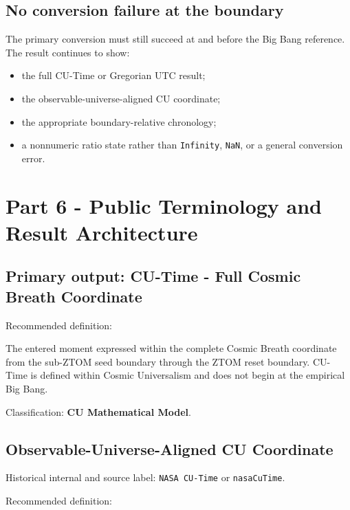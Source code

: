 \documentclass[11pt,letterpaper]{article}
\newcommand{\term}[1]{\textbf{\textsf{#1}}}
\begin{document}
\subsection{No conversion failure at the boundary}

The primary conversion must still succeed at and before the Big Bang reference.
The result continues to show:

\begin{itemize}
    \item the full CU-Time or Gregorian UTC result;
    \item the observable-universe-aligned CU coordinate;
    \item the appropriate boundary-relative chronology;
    \item a nonnumeric ratio state rather than \texttt{Infinity}, \texttt{NaN},
          or a general conversion error.
\end{itemize}

\section{Part 6 - Public Terminology and Result Architecture}

\subsection{Primary output: CU-Time - Full Cosmic Breath Coordinate}

Recommended definition:

\begin{notebox}
The entered moment expressed within the complete Cosmic Breath coordinate from
the sub-ZTOM seed boundary through the ZTOM reset boundary. CU-Time is defined
within Cosmic Universalism and does not begin at the empirical Big Bang.
\end{notebox}

Classification: \term{CU Mathematical Model}.

\subsection{Observable-Universe-Aligned CU Coordinate}

Historical internal and source label: \texttt{NASA CU-Time} or
\texttt{nasaCuTime}.

Recommended definition:
\end{document}
